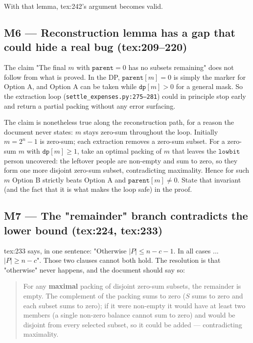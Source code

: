 \documentclass[11pt]{article}
\begin{document}
With that lemma, tex:242's argument becomes valid.

\subsection{M6 --- Reconstruction lemma has a gap that could hide a real bug (tex:209--220)}

The claim "The final $m$ with $\texttt{parent} = 0$ has no subsets remaining" does not follow from what
is proved. In the DP, $\texttt{parent}[m] = 0$ is simply the marker for Option A, and Option A can be
taken while $\texttt{dp}[m] > 0$ for a general mask. So the extraction loop
(\texttt{settle\_expenses.py:275--281}) could in principle stop early and return a partial packing
without any error surfacing.

The claim is nonetheless true along the reconstruction path, for a reason the document never states:
$m$ stays zero-sum throughout the loop. Initially $m = 2^n - 1$ is zero-sum; each extraction removes a
zero-sum subset. For a zero-sum $m$ with $\texttt{dp}[m] \ge 1$, take an optimal packing of $m$ that
leaves the $\texttt{lowbit}$ person uncovered: the leftover people are non-empty and sum to zero, so
they form one more disjoint zero-sum subset, contradicting maximality. Hence for such $m$ Option B strictly
beats Option A and $\texttt{parent}[m] \ne 0$. State that invariant (and the fact that it is what makes
the loop safe) in the proof.

\subsection{M7 --- The "remainder" branch contradicts the lower bound (tex:224, tex:233)}

tex:233 says, in one sentence: "Otherwise $|P| \le n - c - 1$. In all cases ... $|P| \ge n - c$". Those
two clauses cannot both hold. The resolution is that "otherwise" never happens, and the document should
say so:

\begin{quote}
  For any \textbf{maximal} packing of disjoint zero-sum subsets, the remainder is empty. The complement
of the packing sums to zero ($S$ sums to zero and each subset sums to zero); if it were non-empty it would
have at least two members (a single non-zero balance cannot sum to zero) and would be disjoint from every
selected subset, so it could be added --- contradicting maximality.
\end{quote}
\end{document}
